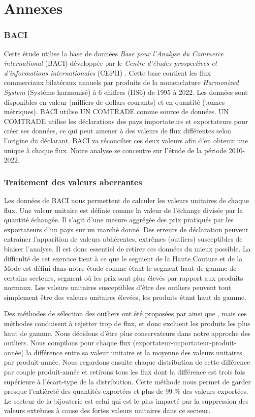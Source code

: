 \documentclass[french,10pt,a4paper]{article}
\newenvironment{annexes}{
    \section*{Annexes}
    \addcontentsline{toc}{section}{Annexes}
    \setstretch{2} %
}{
    \setstretch{1} %
}
\begin{document}
\begin{annexes}
\subsubsection*{BACI}
Cette étude utilise la base de données \textit{Base pour l'Analyse du Commerce international} (BACI) développée par le \textit{Centre d'études prospectives et d'informations internationales} (CEPII) \citep{Gaulier2010}. Cette base contient les flux commerciaux bilatéraux annuels par produits de la nomenclature \textit{Harmonized System} (Système harmonisé) à 6 chiffres (HS6) de 1995 à 2022. Les données sont disponibles en valeur (milliers de dollars courants) et en quantité (tonnes métriques). BACI utilise UN COMTRADE comme source de données. UN COMTRADE utilise les déclarations des pays importateurs et exportateurs pour créer ses données, ce qui peut amener à des valeurs de flux différentes selon l'origine du déclarant. BACI va réconcilier ces deux valeurs afin d'en obtenir une unique à chaque flux. Notre analyse se concentre sur l'étude de la période 2010-2022.

\subsubsection*{Traitement des valeurs aberrantes}
Les données de BACI nous permettent de calculer les valeurs unitaires de chaque flux. Une valeur unitaire est définie comme la valeur de l'échange divisée par la quantité échangée. Il s'agit d'une mesure aggrégée des prix pratiqués par les exportateurs d'un pays sur un marché donné. Des erreurs de déclaration peuvent entraîner l'apparition de valeurs abhérentes, extrêmes (outliers) susceptibles de biaiser l'analyse. Il est donc essentiel de retirer ces données du mieux possible. La difficulté de cet exercice tient à ce que le segment de la Haute Couture et de la Mode est défini dans notre étude comme étant le segment haut de gamme de certains secteurs, segment où les prix sont plus élevés par rapport aux produits normaux. Les valeurs unitaires susceptibles d'être des outliers peuvent tout simplement être des valeurs unitaires élevées, les produits étant haut de gamme.

Des méthodes de sélection des outliers ont été proposées par \cite{Hallak2006} ainsi que \cite{Fontagne2013}, mais ces méthodes conduisent à rejetter trop de flux, et donc excluent les produits les plus haut de gamme. Nous décidons d'être plus conservateurs dans notre approche des outliers. Nous compilons pour chaque flux (exportateur-importateur-produit-année) la différence entre sa valeur unitaire et la moyenne des valeurs unitaires par produit-année. Nous regardons ensuite chaque distribution de cette différence par couple produit-année et retirons tous les flux dont la différence est trois fois supérieure à l'écart-type de la distribution. Cette méthode nous permet de garder presque l'entièreté des quantités exportées et plus de 99 \% des valeurs exportées. Le secteur de la bijouterie est celui qui est le plus impacté par la suppression des valeurs extrêmes à cause des fortes valeurs unitaires dans ce secteur.


\end{annexes}
\end{document}
